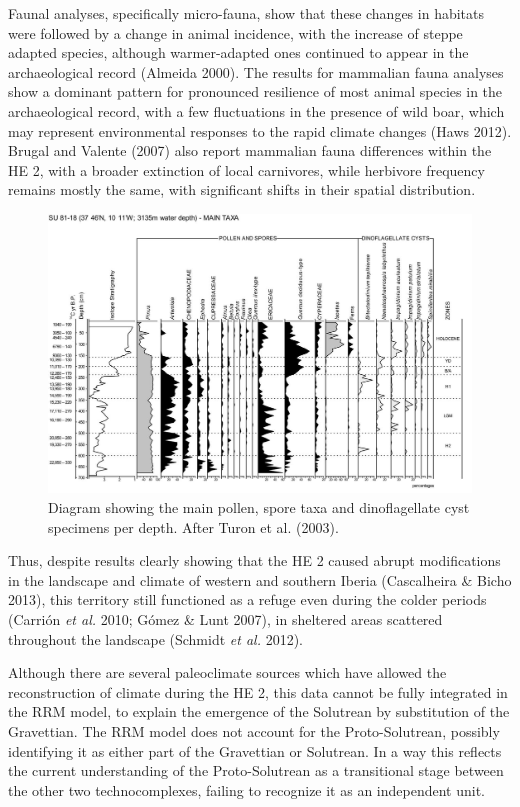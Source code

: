 \documentclass[12pt,twoside]{reedthesis}
\begin{document}
Faunal analyses, specifically micro-fauna, show that these changes in habitats were followed by a change in animal incidence, with the increase of steppe adapted species, although warmer-adapted ones continued to appear in the archaeological record (Almeida 2000). The results for mammalian fauna analyses show a dominant pattern for pronounced resilience of most animal species in the archaeological record, with a few fluctuations in the presence of wild boar, which may represent environmental responses to the rapid climate changes (Haws 2012). Brugal and Valente (2007) also report mammalian fauna differences within the HE 2, with a broader extinction of local carnivores, while herbivore frequency remains mostly the same, with significant shifts in their spatial distribution.
\begin{figure}[H]

{\centering \includegraphics[width=0.8\linewidth]{figure/Turon2003_SU81-18} 

}

\caption{Diagram showing the main pollen, spore taxa and dinoflagellate cyst specimens per depth. After Turon et al. (2003).}\label{fig:su8118}
\end{figure}
Thus, despite results clearly showing that the HE 2 caused abrupt modifications in the landscape and climate of western and southern Iberia (Cascalheira \& Bicho 2013), this territory still functioned as a refuge even during the colder periods (Carrión \emph{et al.} 2010; Gómez \& Lunt 2007), in sheltered areas scattered throughout the landscape (Schmidt \emph{et al.} 2012).

Although there are several paleoclimate sources which have allowed the reconstruction of climate during the HE 2, this data cannot be fully integrated in the RRM model, to explain the emergence of the Solutrean by substitution of the Gravettian. The RRM model does not account for the Proto-Solutrean, possibly identifying it as either part of the Gravettian or Solutrean. In a way this reflects the current understanding of the Proto-Solutrean as a transitional stage between the other two technocomplexes, failing to recognize it as an independent unit.
\end{document}
